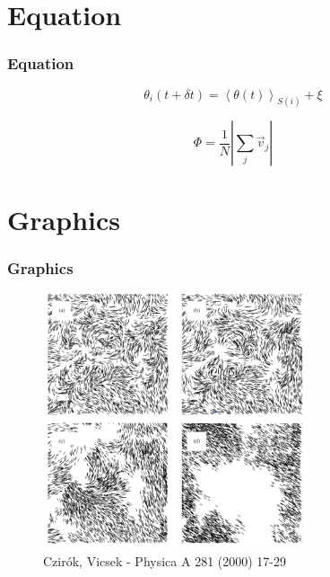 \documentclass{beamer}
\begin{document}
\section{Equation}
\begin{frame}
	\frametitle{Equation}
	\begin{equation}
	\theta_i(t + \delta t) = \left< \theta (t) \right> _{S(i)} + \xi
	\end{equation}
	
	\begin{equation}
	\Phi = \frac{1}{N} \left| \sum_j \vec{v}_j \right|
	\end{equation}
\end{frame}

\section{Graphics}
\begin{frame}
	\frametitle{Graphics}
	\begin{figure}[H]
	\caption{Czirók, Vicsek - Physica A 281 (2000) 17-29}
	\includegraphics[width=0.7\textwidth, height=0.7\textheight]{images/wyniki.png}
	\end{figure}	
\end{frame}
\end{document}
